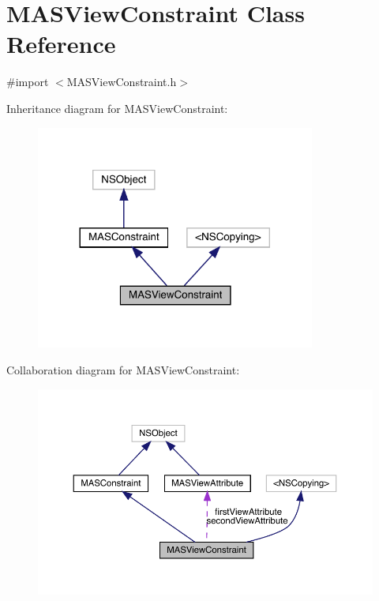 \hypertarget{interface_m_a_s_view_constraint}{}\section{M\+A\+S\+View\+Constraint Class Reference}
\label{interface_m_a_s_view_constraint}


{\ttfamily \#import $<$M\+A\+S\+View\+Constraint.\+h$>$}



Inheritance diagram for M\+A\+S\+View\+Constraint\+:\nopagebreak
\begin{figure}[H]
\begin{center}
\leavevmode
\includegraphics[width=260pt]{interface_m_a_s_view_constraint__inherit__graph}
\end{center}
\end{figure}


Collaboration diagram for M\+A\+S\+View\+Constraint\+:\nopagebreak
\begin{figure}[H]
\begin{center}
\leavevmode
\includegraphics[width=350pt]{interface_m_a_s_view_constraint__coll__graph}
\end{center}
\end{figure}
